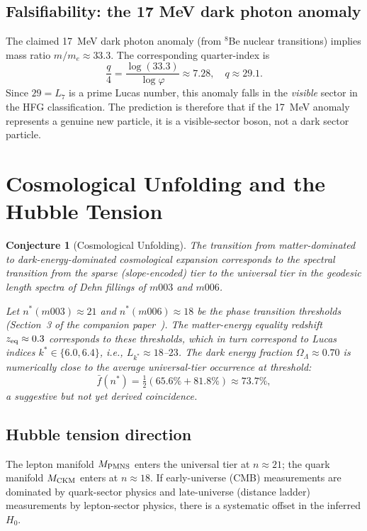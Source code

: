 \documentclass[12pt]{article}
\newtheorem{conjecture}{Conjecture}
\newcommand{\ph}{\varphi}
\begin{document}
\subsection{Falsifiability: the 17 MeV dark photon anomaly}

The claimed 17~MeV dark photon anomaly (from ${}^8$Be nuclear
transitions) implies mass ratio $m/m_e \approx 33.3$. The
corresponding quarter-index is
\[
  \frac{q}{4} = \frac{\log(33.3)}{\log\ph} \approx 7.28,
  \quad q \approx 29.1.
\]
Since $29 = L_7$ is a prime Lucas number, this anomaly falls in
the \emph{visible} sector in the HFG classification. The
prediction is therefore that if the 17~MeV anomaly represents
a genuine new particle, it is a visible-sector boson, not a
dark sector particle.

\section{Cosmological Unfolding and the Hubble Tension}
\label{sec:cosmo}

\begin{conjecture}[Cosmological Unfolding]
\label{conj:cosmo}
The transition from matter-dominated to dark-energy-dominated
cosmological expansion corresponds to the spectral transition from
the sparse (slope-encoded) tier to the universal tier in the
geodesic length spectra of Dehn fillings of $m003$ and $m006$.

Let $n^*(m003) \approx 21$ and $n^*(m006) \approx 18$ be the
phase transition thresholds (Section~3 of the companion
paper~\cite{Gentry:SU}). The matter-energy equality redshift
$z_{\rm eq} \approx 0.3$ corresponds to these thresholds, which
in turn correspond to Lucas indices $k^* \in \{6.0, 6.4\}$, i.e.,
$L_{k^*} \approx 18$--$23$. The dark energy fraction
$\Omega_\Lambda \approx 0.70$ is numerically close to the average
universal-tier occurrence at threshold:
\[
  \bar{f}(n^*) = \tfrac{1}{2}(65.6\% + 81.8\%) \approx 73.7\%,
\]
a suggestive but not yet derived coincidence.
\end{conjecture}

\subsection{Hubble tension direction}

The lepton manifold $M_{\rm PMNS}$ enters the universal tier at
$n \approx 21$; the quark manifold $M_{\rm CKM}$ enters at
$n \approx 18$. If early-universe (CMB) measurements are dominated
by quark-sector physics and late-universe (distance ladder)
measurements by lepton-sector physics, there is a systematic
offset in the inferred $H_0$.
\end{document}
